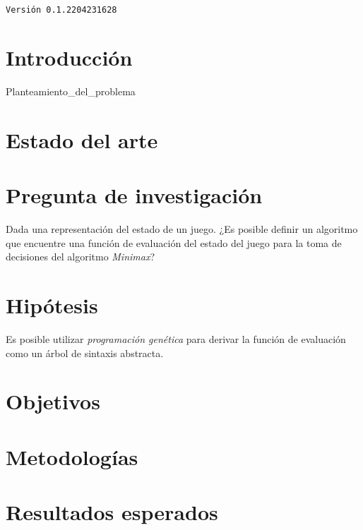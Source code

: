 \documentclass{article}
\begin{document}
  \begin{titlepage}
    \centering
    \vspace*{2cm}
    \titleblock [2cm]
    \vspace{1cm}  %
    \authorblock
    \vfill  %
    \location \\
    \dateblock  \\
    \footnotesize\texttt{Versión 0.1.2204231628}
  \end{titlepage}

 
  \section{Introducción}
    \blindtext
  {Planteamiento_del_problema}

  \section{Estado del arte}
    \Blinddescription

  \section{Pregunta de investigación}
    Dada una representación del estado de un juego. 
    ¿Es posible definir un algoritmo que encuentre una función de evaluación del estado del juego 
    para la toma de decisiones del algoritmo \textit{Minimax}?

  \section{Hipótesis}
    Es posible utilizar \textit{programación genética} para derivar la función de evaluación como
    un árbol de sintaxis abstracta.

  \section{Objetivos}
    \blinditemize

  \section{Metodologías}
    \Blindtext

  \section{Resultados esperados}
    \blindtext

  \printbibliography
\end{document}
